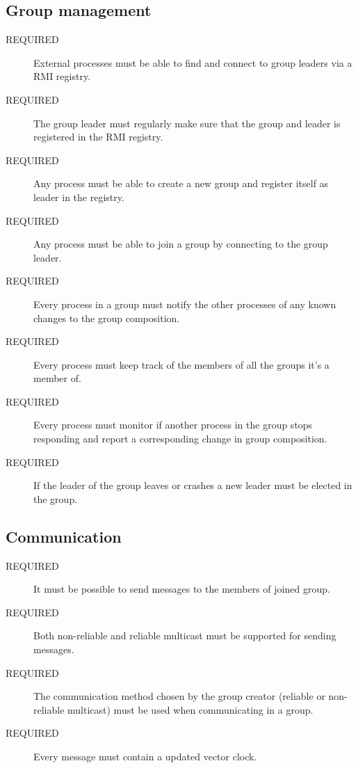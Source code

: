 \documentclass[a4paper,english]{article}
\begin{document}
\subsection{Group management}
\begin{description}
\item[REQUIRED] External processes must be able to find and connect to group leaders via a RMI registry.

\item[REQUIRED] The group leader must regularly make sure that the group and leader is registered in the RMI registry.

\item[REQUIRED] Any process must be able to create a new group and register itself as leader in the registry.

\item[REQUIRED] Any process must be able to join a group by connecting to the group leader.

\item[REQUIRED] Every process in a group must notify the other processes of any known changes to the group composition.

\item[REQUIRED] Every process must keep track of the members of all the groups it's a member of.

\item[REQUIRED] Every process must monitor if another process in the group stops responding and report a corresponding change in group composition.

\item[REQUIRED] If the leader of the group leaves or crashes a new leader must be elected in the group.
\end{description}


\subsection{Communication}
\begin{description}
\item[REQUIRED] It must be possible to send messages to the members of joined group.

\item[REQUIRED] Both non-reliable and reliable multicast must be supported for sending messages.

\item[REQUIRED] The communication method chosen by the group creator (reliable or non-reliable multicast) must be used when communicating in a group.

\item[REQUIRED] Every message must contain a updated vector clock.
\end{description}
\end{document}
